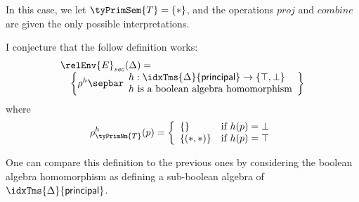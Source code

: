In this case, we let $\tyPrimSem{T} = \{*\}$, and the operations
$\mathit{proj}$ and $\mathit{combine}$ are given the only possible
interpretations.

I conjecture that the follow definition works:
\begin{displaymath}
  \begin{array}{l}
    \relEnv{E}_{\mathit{sec}}(\Delta) = \\
    \quad\left\{ \rho^{h} \sepbar
      \begin{array}{l}
        h : \idxTms{\Delta}{\mathsf{principal}} \to \{\top,\bot\} \\
        h\textrm{ is a boolean algebra homomorphism}
      \end{array}
    \right\}
  \end{array}
\end{displaymath}
where
\begin{displaymath}
  \rho^{h}_{\tyPrimNm{T}}(p) = \left\{
    \begin{array}{ll}
      \{\} & \textrm{if }h(p) = \bot \\
      \{(*,*) \} & \textrm{if }h(p) = \top
    \end{array}
  \right.
\end{displaymath}

One can compare this definition to the previous ones by considering
the boolean algebra homomorphism as defining a sub-boolean algebra of
$\idxTms{\Delta}{\mathsf{principal}}$.
